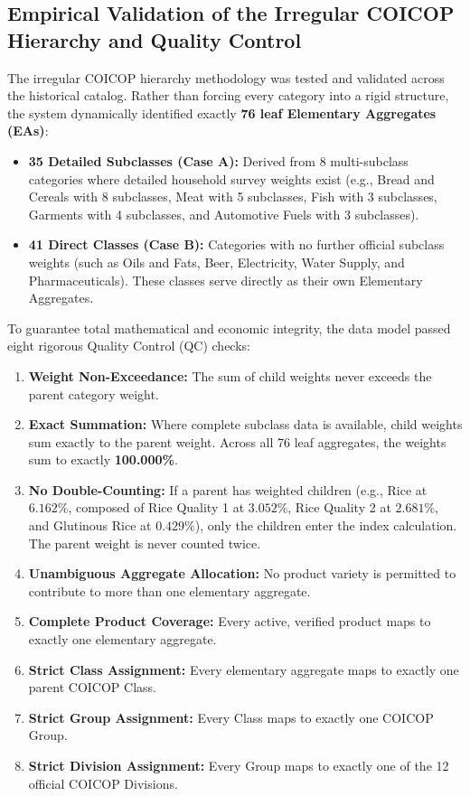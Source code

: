 \subsection{Empirical Validation of the Irregular COICOP Hierarchy and Quality Control}
\hs The irregular COICOP hierarchy methodology was tested and validated across the historical catalog. Rather than forcing every category into a rigid structure, the system dynamically identified exactly \textbf{76 leaf Elementary Aggregates (EAs)}:
\begin{itemize}
    \item \textbf{35 Detailed Subclasses (Case A):} Derived from 8 multi-subclass categories where detailed household survey weights exist (e.g., Bread and Cereals with 8 subclasses, Meat with 5 subclasses, Fish with 3 subclasses, Garments with 4 subclasses, and Automotive Fuels with 3 subclasses).
    \item \textbf{41 Direct Classes (Case B):} Categories with no further official subclass weights (such as Oils and Fats, Beer, Electricity, Water Supply, and Pharmaceuticals). These classes serve directly as their own Elementary Aggregates.
\end{itemize}

\hs To guarantee total mathematical and economic integrity, the data model passed eight rigorous Quality Control (QC) checks:
\begin{enumerate}
    \item \textbf{Weight Non-Exceedance:} The sum of child weights never exceeds the parent category weight.
    \item \textbf{Exact Summation:} Where complete subclass data is available, child weights sum exactly to the parent weight. Across all 76 leaf aggregates, the weights sum to exactly \textbf{100.000\%}.
    \item \textbf{No Double-Counting:} If a parent has weighted children (e.g., Rice at $6.162\%$, composed of Rice Quality 1 at $3.052\%$, Rice Quality 2 at $2.681\%$, and Glutinous Rice at $0.429\%$), only the children enter the index calculation. The parent weight is never counted twice.
    \item \textbf{Unambiguous Aggregate Allocation:} No product variety is permitted to contribute to more than one elementary aggregate.
    \item \textbf{Complete Product Coverage:} Every active, verified product maps to exactly one elementary aggregate.
    \item \textbf{Strict Class Assignment:} Every elementary aggregate maps to exactly one parent COICOP Class.
    \item \textbf{Strict Group Assignment:} Every Class maps to exactly one COICOP Group.
    \item \textbf{Strict Division Assignment:} Every Group maps to exactly one of the 12 official COICOP Divisions.
\end{enumerate}

